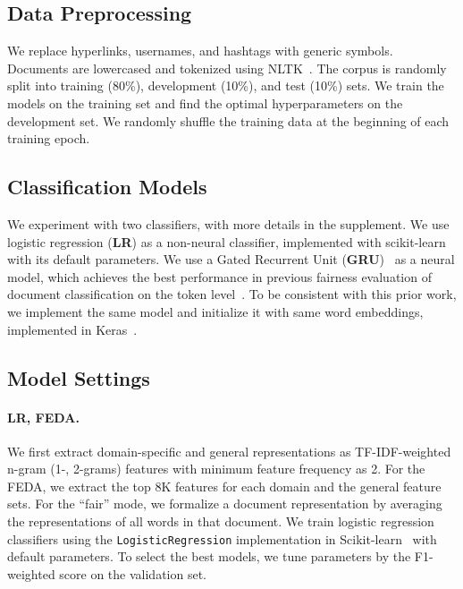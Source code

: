 \subsection{Data Preprocessing}
We replace hyperlinks, usernames, and hashtags with generic symbols. Documents are lowercased and tokenized using NLTK~\cite{bird2004nltk}. 
The corpus is randomly split into training (80\%), development (10\%), and test (10\%) sets. 
We train the models on the training set and find the optimal hyperparameters on the development set. 
We randomly shuffle the training data at the beginning of each training epoch. 

\subsection{Classification Models}
We experiment with two classifiers, with more details in the supplement.
We use logistic regression (\textbf{LR}) as a non-neural classifier,
implemented with scikit-learn~\cite{pedregosa2011scikit} with its default parameters.
We use a Gated Recurrent Unit (\textbf{GRU})~\cite{chung2014empirical} as a neural model, which achieves the best performance in previous fairness evaluation of document classification on the token level~\cite{park2018reducing}. 
To be consistent with this prior work, we implement the same model and initialize it with same word embeddings, implemented in Keras~\cite{chollet2015keras}.

\subsection{Model Settings}

\paragraph{LR, FEDA.} We first extract domain-specific and general representations as TF-IDF-weighted n-gram (1-, 2-grams) features with minimum feature frequency as 2. For the FEDA, we extract the top 8K features for each domain and the general feature sets.
For the ``fair'' mode, we formalize a document representation by averaging the representations of all words in that document.
We train logistic regression classifiers using the \texttt{LogisticRegression} implementation in Scikit-learn~\cite{pedregosa2011scikit} with default parameters.
To select the best models, we tune parameters by the F1-weighted score on the validation set.

